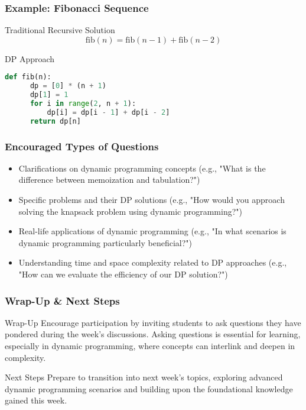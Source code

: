 \documentclass[aspectratio=169]{beamer}
\begin{document}
\begin{frame}[fragile]
  \frametitle{Example: Fibonacci Sequence}
  \begin{block}{Traditional Recursive Solution}
  \begin{equation}
  \text{fib}(n) = \text{fib}(n-1) + \text{fib}(n-2)
  \end{equation}
  \end{block}

  \begin{block}{DP Approach}
  \begin{lstlisting}[language=Python]
  def fib(n):
      dp = [0] * (n + 1)
      dp[1] = 1
      for i in range(2, n + 1):
          dp[i] = dp[i - 1] + dp[i - 2]
      return dp[n]
  \end{lstlisting}
  \end{block}
\end{frame}

\begin{frame}[fragile]
  \frametitle{Encouraged Types of Questions}
  \begin{itemize}
    \item Clarifications on dynamic programming concepts (e.g., "What is the difference between memoization and tabulation?")
    \item Specific problems and their DP solutions (e.g., "How would you approach solving the knapsack problem using dynamic programming?")
    \item Real-life applications of dynamic programming (e.g., "In what scenarios is dynamic programming particularly beneficial?")
    \item Understanding time and space complexity related to DP approaches (e.g., "How can we evaluate the efficiency of our DP solution?")
  \end{itemize}
\end{frame}

\begin{frame}[fragile]
  \frametitle{Wrap-Up & Next Steps}
  \begin{block}{Wrap-Up}
    Encourage participation by inviting students to ask questions they have pondered during the week's discussions. Asking questions is essential for learning, especially in dynamic programming, where concepts can interlink and deepen in complexity.
  \end{block}
  
  \begin{block}{Next Steps}
    Prepare to transition into next week’s topics, exploring advanced dynamic programming scenarios and building upon the foundational knowledge gained this week.
  \end{block}
\end{frame}
\end{document}
